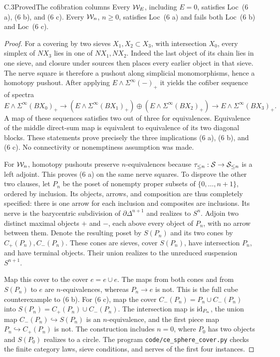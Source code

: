 \begin{claim}{C.3}{Proved}{The cofibration columns}
Every $\mathcal{W}_E$, including $E=0$, satisfies Loc~(6 a), (6 b), and (6 c).
Every $\mathcal{W}_n$, $n\geq0$, satisfies Loc~(6 a) and fails both Loc~(6 b)
and Loc~(6 c).
\end{claim}
\begin{proof}
For a covering by two sieves $X_1,X_2\subset X_3$, with intersection
$X_0$, every simplex of $NX_3$ lies in one of $NX_1,NX_2$. Indeed the
last object of its chain lies in one sieve, and closure under sources
then places every earlier object in that sieve. The nerve square is
therefore a pushout along simplicial monomorphisms, hence a homotopy
pushout. After applying $E\wedge\Sigma^\infty(-)_+$ it yields the
cofiber sequence of spectra
\[
 E\wedge\Sigma^\infty(BX_0)_+
 \longrightarrow
 (E\wedge\Sigma^\infty(BX_1)_+)\oplus
 (E\wedge\Sigma^\infty(BX_2)_+)
 \longrightarrow E\wedge\Sigma^\infty(BX_3)_+.
\]
A map of these sequences satisfies two out of three for equivalences.
Equivalence of the middle direct-sum map is equivalent to equivalence
of its two diagonal blocks. These statements prove precisely the three
implications (6 a), (6 b), and (6 c). No connectivity or nonemptiness
assumption was made.

For $\mathcal{W}_n$, homotopy pushouts preserve $n$-equivalences because
$\tau_{\leq n}:\mathcal{S}\to\mathcal{S}_{\leq n}$ is a left adjoint. This proves
(6 a) on the same nerve squares. To disprove the other two clauses,
let $P_n$ be the poset of nonempty proper subsets of
$\{0,\ldots,n+1\}$, ordered by inclusion. Its objects, arrows, and
composition are thus completely specified: there is one arrow for
each inclusion and composites are inclusions. Its nerve is the
barycentric subdivision of $\partial\Delta^{n+1}$ and realizes to
$S^n$. Adjoin two distinct maximal objects $+$ and $-$, each above
every object of $P_n$, with no arrow between them. Denote the resulting
poset by $S(P_n)$ and its two cones by $C_+(P_n),C_-(P_n)$.
These cones are sieves, cover $S(P_n)$, have intersection $P_n$,
and have terminal objects. Their union realizes to the unreduced
suspension $S^{n+1}$.

Map this cover to the cover $e=e\cup e$. The maps from both cones and
from $S(P_n)$ to $e$ are $n$-equivalences, whereas $P_n\to e$ is not.
This is the full cube counterexample to (6 b). For (6 c), map the
cover $C_-(P_n)=P_n\cup C_-(P_n)$ into
$S(P_n)=C_+(P_n)\cup C_-(P_n)$. The intersection map is $\mathrm{id}_{P_n}$,
the union map $C_-(P_n)\hookrightarrow S(P_n)$ is an $n$-equivalence,
and the first piece map $P_n\hookrightarrow C_+(P_n)$ is not.
The construction includes $n=0$, where $P_0$ has two objects and
$S(P_0)$ realizes to a circle. The program
\texttt{code/ce\_sphere\_cover.py} checks the finite category laws,
sieve conditions, and nerves of the first four instances.
\end{proof}

